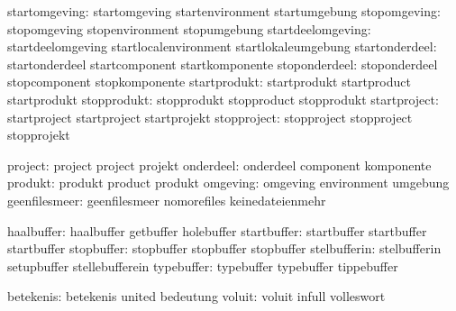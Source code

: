                 startomgeving:  startomgeving                startenvironment
                                startumgebung
                 stopomgeving:  stopomgeving                 stopenvironment
                                stopumgebung
            startdeelomgeving:  startdeelomgeving            startlocalenvironment
                                startlokaleumgebung
               startonderdeel:  startonderdeel               startcomponent
                                startkomponente
                stoponderdeel:  stoponderdeel                stopcomponent
                                stopkomponente
                 startprodukt:  startprodukt                 startproduct
                                startprodukt
                  stopprodukt:  stopprodukt                  stopproduct
                                stopprodukt
                 startproject:  startproject                 startproject
                                startprojekt
                  stopproject:  stopproject                  stopproject
                                stopprojekt

                      project:  project                      project
                                projekt
                    onderdeel:  onderdeel                    component
                                komponente
                      produkt:  produkt                      product
                                produkt
                     omgeving:  omgeving                     environment
                                umgebung
                geenfilesmeer:  geenfilesmeer                nomorefiles
                                keinedateienmehr

                   haalbuffer:  haalbuffer                   getbuffer
                                holebuffer
                  startbuffer:  startbuffer                  startbuffer
                                startbuffer
                   stopbuffer:  stopbuffer                   stopbuffer
                                stopbuffer
                 stelbufferin:  stelbufferin                 setupbuffer
                                stellebufferein
                   typebuffer:  typebuffer                   typebuffer
                                tippebuffer

                    betekenis:  betekenis                    united
                                bedeutung
                       voluit:  voluit                       infull
                                volleswort

